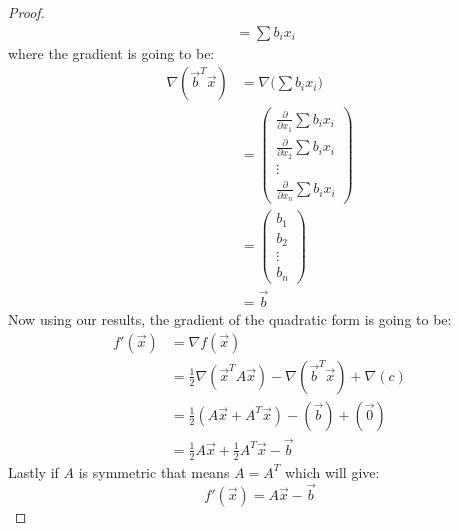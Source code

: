 \documentclass[12pt, letterpaper, onecolumn, conference, final]{IEEEtran}
\theoremstyle{definition}
\theoremstyle{plain}
\begin{document}
\begin{proof}
\begin{equation*}
\begin{split}
&= \sum b_ix_i
\end{split}
\end{equation*}
where the gradient is going to be:
\renewcommand*{\arraystretch}{1.2}
\begin{equation*}
\begin{split}
\nabla (\overrightarrow{b}^T \overrightarrow{x}) &= \nabla \Big( \sum b_ix_i \Big) \\
&= \begin{pmatrix}
\frac{\partial}{\partial x_1} \sum b_ix_i \\
\frac{\partial}{\partial x_2} \sum b_ix_i \\
\vdots \\
\frac{\partial}{\partial x_n} \sum b_ix_i
\end{pmatrix} \\
&= \begin{pmatrix}
b_1 \\
b_2 \\
\vdots \\
b_n
\end{pmatrix} \\
&= \overrightarrow{b}
\end{split}
\end{equation*}
Now using our results, the gradient of the quadratic form is going to be:
\begin{equation*}
\begin{split}
f'(\overrightarrow{x}) &= \nabla f(\overrightarrow{x}) \\
&= \frac{1}{2}\nabla(\overrightarrow{x}^TA\overrightarrow{x}) - \nabla (\overrightarrow{b}^T \overrightarrow{x}) + \nabla (c) \\
&= \frac{1}{2}(A\overrightarrow{x} + A^T\overrightarrow{x}) - (\overrightarrow{b}) + (\overrightarrow{0}) \\
&= \frac{1}{2}A\overrightarrow{x} + \frac{1}{2}A^T\overrightarrow{x} - \overrightarrow{b}
\end{split}
\end{equation*}
Lastly if $A$ is symmetric that means $A = A^T$ which will give:
\begin{equation*}
f'(\overrightarrow{x}) = A\overrightarrow{x} - \overrightarrow{b}
\end{equation*}
\end{proof}
\end{document}
